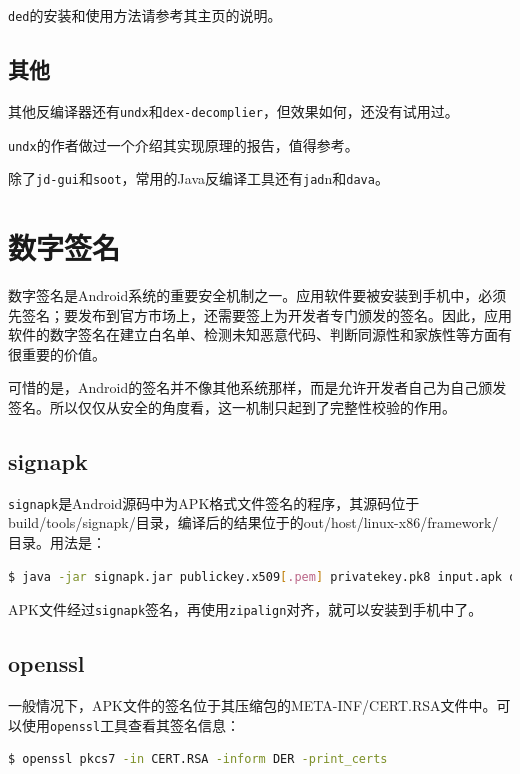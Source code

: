 \lstinline!ded!的安装和使用方法请参考其主页的说明。

\subsection{其他}
其他反编译器还有\lstinline!undx!\cite{url:undx}和\lstinline!dex-decomplier!\cite{url:dex-decomplier}，但效果如何，还没有试用过。

\lstinline!undx!的作者做过一个介绍其实现原理的报告\cite{dalvik_undx}，值得参考。

除了\lstinline!jd-gui!和\lstinline!soot!，常用的Java反编译工具还有\lstinline!jad!\cite{url:jad}n和\lstinline!dava!\cite{url:dava}。

\section{数字签名}
数字签名是Android系统的重要安全机制之一。应用软件要被安装到手机中，必须先签名；要发布到官方市场上，还需要签上为开发者专门颁发的签名。因此，应用软件的数字签名在建立白名单、检测未知恶意代码、判断同源性和家族性等方面有很重要的价值。

可惜的是，Android的签名并不像其他系统那样，而是允许开发者自己为自己颁发签名。所以仅仅从安全的角度看，这一机制只起到了完整性校验的作用。

\subsection{signapk}
\lstinline!signapk!是Android源码中为APK格式文件签名的程序，其源码位于build/tools/signapk/目录，编译后的结果位于的out/host/linux-x86/framework/目录。用法是：
\begin{lstlisting}[language=bash, numbers=none]
 $ java -jar signapk.jar publickey.x509[.pem] privatekey.pk8 input.apk output.apk
\end{lstlisting}
APK文件经过\lstinline!signapk!签名，再使用\lstinline!zipalign!对齐，就可以安装到手机中了。

\subsection{openssl}
一般情况下，APK文件的签名位于其压缩包的META-INF/CERT.RSA文件中。可以使用\lstinline!openssl!\cite{url:openssl}工具查看其签名信息：
\begin{lstlisting}[language=bash, numbers=none]
 $ openssl pkcs7 -in CERT.RSA -inform DER -print_certs
\end{lstlisting}

